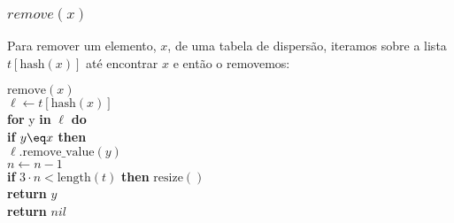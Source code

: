 \documentclass{beamer}
\begin{document}
\begin{frame}
\frametitle{$remove(x)$}
Para remover um elemento, $ \ensuremath{x}$, de uma tabela de dispersão, iteramos sobre a lista $ \ensuremath{t[\mathrm{hash}(x)]}$ até encontrar  $ \ensuremath{x}$ e então o removemos:

\begin{oframed}
\begin{flushleft}
\hspace*{1em} \ensuremath{\mathrm{remove}(x)}\\
\hspace*{1em} \hspace*{1em} \ensuremath{\ensuremath{\mathit{\ell}} \gets  \ensuremath{t[\mathrm{hash}(x)]}}\\
\hspace*{1em} \hspace*{1em} {\color{black} \textbf{for}} y {\color{black} \textbf{in}} \ensuremath{\ell} {\color{black} \textbf{do}} \\
\hspace*{1em} \hspace*{1em} \hspace*{1em} {\color{black} \textbf{if}} \ensuremath{y \eq x} {\color{black} \textbf{then}} \\
\hspace*{1em} \hspace*{1em} \hspace*{1em} \hspace*{1em} \ensuremath{\ensuremath{\mathit{\ell}}.\mathrm{remove\_value}(y)}\\
\hspace*{1em} \hspace*{1em} \hspace*{1em} \hspace*{1em} \ensuremath{n \gets  \ensuremath{n - 1}}\\
\hspace*{1em} \hspace*{1em} \hspace*{1em} \hspace*{1em} {\color{black} \textbf{if}} \ensuremath{3\cdot n < \mathrm{length}(t)} {\color{black} \textbf{then}}  \ensuremath{\mathrm{resize}()} \\
\hspace*{1em} \hspace*{1em} \hspace*{1em} \hspace*{1em} {\color{black} \textbf{return}} \ensuremath{y}\\
\hspace*{1em} \hspace*{1em} {\color{black} \textbf{return}} \ensuremath{nil} \\
\end{flushleft}
\end{oframed} 

\end{frame}
\end{document}
